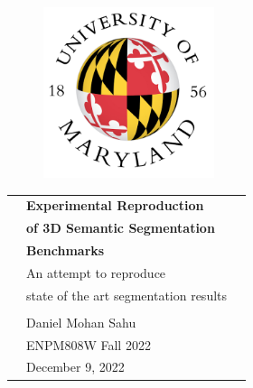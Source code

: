 \begin{center}

\vspace*{1cm}

\begin{figure}
  \raggedleft
  \begin{minipage}{4cm}
  \includegraphics[width=5cm]{images/informal-seal.png}
  \end{minipage}
\end{figure}

\vspace*{2cm}

\vspace*{0.1in}

\begin{spacing}{1.7}

\begin{tabular}{p{4cm} ll}

& \textbf{\huge Experimental Reproduction}\\
& \textbf{\huge of 3D Semantic Segmentation}\\
& \textbf{\huge Benchmarks}\\
& \Large An attempt to reproduce \\
& \Large state of the art segmentation results\\

& \\
& \large Daniel Mohan Sahu \\
& \large ENPM808W Fall 2022 \\
& \large December 9, 2022
\end{tabular}

\end{spacing}

\end{center}



\thispagestyle{empty} %
\clearpage\setcounter{page}{1} %
